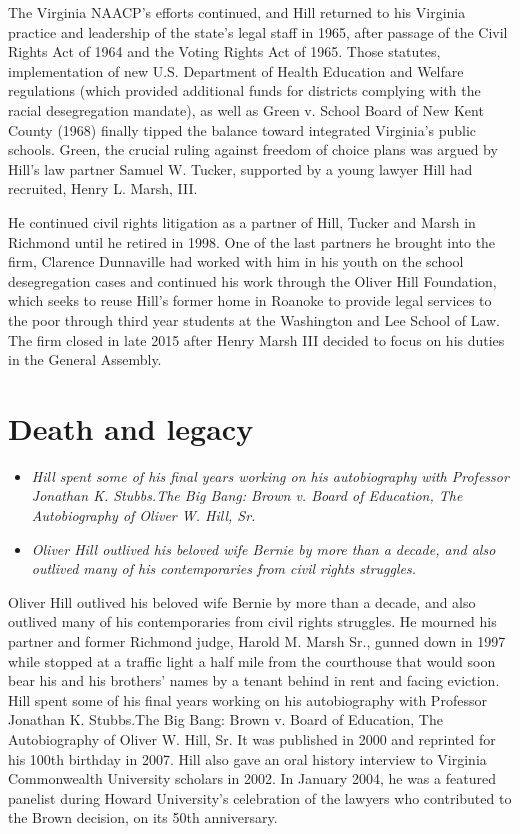 The Virginia NAACP's efforts continued, and Hill returned to his
Virginia practice and leadership of the state's legal staff in 1965,
after passage of the Civil Rights Act of 1964 and the Voting Rights Act
of 1965. Those statutes, implementation of new U.S. Department of Health
Education and Welfare regulations (which provided additional funds for
districts complying with the racial desegregation mandate), as well as
Green v. School Board of New Kent County (1968) finally tipped the
balance toward integrated Virginia's public schools. Green, the crucial
ruling against freedom of choice plans was argued by Hill's law partner
Samuel W. Tucker, supported by a young lawyer Hill had recruited, Henry
L. Marsh, III.

He continued civil rights litigation as a partner of Hill, Tucker and
Marsh in Richmond until he retired in 1998. One of the last partners he
brought into the firm, Clarence Dunnaville had worked with him in his
youth on the school desegregation cases and continued his work through
the Oliver Hill Foundation, which seeks to reuse Hill's former home in
Roanoke to provide legal services to the poor through third year
students at the Washington and Lee School of Law. The firm closed in
late 2015 after Henry Marsh III decided to focus on his duties in the
General Assembly.

\section{Death and legacy}\label{death-and-legacy}

\begin{itemize}
\item
  \emph{Hill spent some of his final years working on his autobiography
  with Professor Jonathan K. Stubbs.The Big Bang: Brown v. Board of
  Education, The Autobiography of Oliver W. Hill, Sr.}
\item
  \emph{Oliver Hill outlived his beloved wife Bernie by more than a
  decade, and also outlived many of his contemporaries from civil rights
  struggles.}
\end{itemize}

Oliver Hill outlived his beloved wife Bernie by more than a decade, and
also outlived many of his contemporaries from civil rights struggles. He
mourned his partner and former Richmond judge, Harold M. Marsh Sr.,
gunned down in 1997 while stopped at a traffic light a half mile from
the courthouse that would soon bear his and his brothers' names by a
tenant behind in rent and facing eviction. Hill spent some of his final
years working on his autobiography with Professor Jonathan K. Stubbs.The
Big Bang: Brown v. Board of Education, The Autobiography of Oliver W.
Hill, Sr. It was published in 2000 and reprinted for his 100th birthday
in 2007. Hill also gave an oral history interview to Virginia
Commonwealth University scholars in 2002. In January 2004, he was a
featured panelist during Howard University's celebration of the lawyers
who contributed to the Brown decision, on its 50th anniversary.

